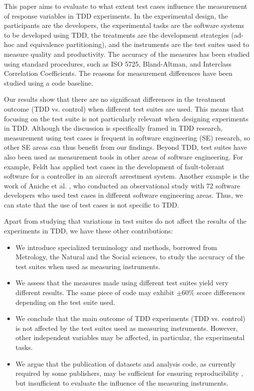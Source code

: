 This paper aims to evaluate to what extent test cases influence the measurement of response variables in TDD experiments. In the experimental design, the participants are the developers, the experimental tasks are the software systems to be developed using TDD, the treatments are the development strategies (ad-hoc and equivalence partitioning), and the instruments are the test suites used to measure quality and productivity. The accuracy of the measures has been studied using standard procedures, such as ISO 5725, Bland-Altman, and Interclass Correlation Coefficients. The reasons for measurement differences have been studied using a code baseline. 

Our results show that there are no significant differences in the treatment outcome (TDD vs. control) when different test suites are used. This means that focusing on the test suite is not particularly relevant when designing experiments in TDD.
Although the discussion is specifically framed in TDD research, measurement using test cases is frequent in software engineering (SE) research, so other SE areas can thus benefit from our findings. Beyond TDD, test suites have also been used as measurement tools in other areas of software engineering. For example, Feldt \cite{feldt1998generating} has applied test cases in the development of fault-tolerant software for a controller in an aircraft arrestment system. Another example is the work of Aniche et al. \cite{Aniche.2022}, who conducted an observational study with 72 software developers who used test cases in different software engineering areas. Thus, we can state that the use of test cases is not specific to TDD.

Apart from studying that variations in test suites do not affect the results of the experiments in TDD, we have these other contributions:
\begin{itemize}

\item We introduce specialized terminology and methods, borrowed from Metrology, the Natural and the Social sciences, to study the accuracy of the test suites when used as measuring instruments.

\item We assess that the measures made using different test suites yield very different results. The same piece of code may exhibit $\pm 60\%$ score differences depending on the test suite used.

\item We conclude that the main outcome of TDD experiments (TDD vs. control) is not affected by the test suites used as measuring instruments. However, other independent variables may be affected, in particular, the experimental tasks.

\item We argue that the publication of datasets and analysis code, as currently required by some publishers, may be sufficient for ensuring reproducibility \cite{NAP25303,fernandez2019open}, but insufficient to evaluate the influence of the measuring instruments.

\end{itemize}

